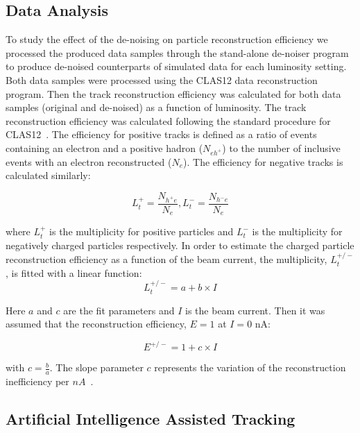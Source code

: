 \subsection{Data Analysis}

To study the effect of the de-noising on particle reconstruction efficiency we processed the produced data samples through the stand-alone de-noiser program to produce de-noised counterparts of simulated data for each luminosity setting.  Both data samples were processed using the CLAS12 data reconstruction program. Then the track reconstruction efficiency was calculated for both data samples (original and de-noised) as a function of luminosity. The track reconstruction efficiency was calculated following the standard procedure for CLAS12~\cite{Stepanyan:2020bg}. The efficiency for positive  tracks is defined as a ratio of 
events containing an electron and a positive  hadron ($N_{eh^+}$) to the number of inclusive events with an electron reconstructed ($N_{e}$). The efficiency for negative tracks is calculated similarly:

\begin{equation}
L_t^+ = \frac{N_{h^+e}}{N_e} , L_t^- = \frac{N_{h^-e}}{N_e} 
\label{eq::eff}
\end{equation}

where $L_t^+$ is the multiplicity for positive particles and $L_t^-$ is the multiplicity for negatively
charged particles respectively. In order to estimate the charged particle reconstruction efficiency
as a function of the beam current, the multiplicity, $L_t^{+/-}$, is fitted with a linear function:
\begin{equation}
L_t^{+/-} = a + b\times I
\label{eq::eff2}
\end{equation}

Here $a$ and $c$ are the fit parameters and $I$ is the beam current. Then it was assumed that the
reconstruction efficiency, $E=1$ at $I=0$ nA:

\begin{equation}
E^{+/-} = 1 + c \times I
\label{eq::eff3}
\end{equation}

with $c=\frac{b}{a}$. The slope parameter $c$ represents the variation of the reconstruction
inefficiency per $nA$~\cite{Stepanyan:2020bg}.

\subsection{Artificial Intelligence Assisted Tracking}

